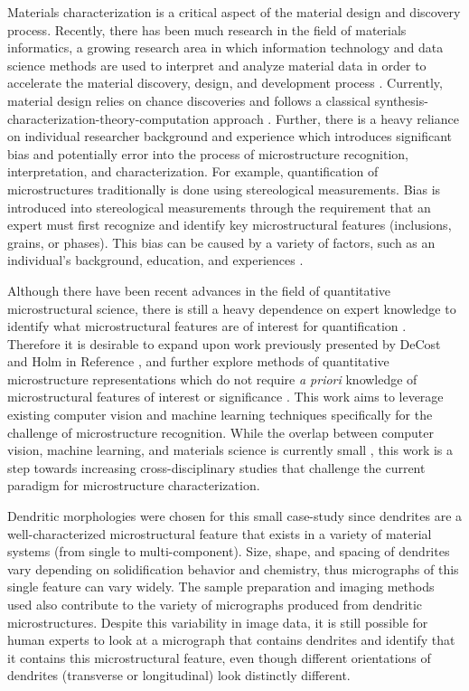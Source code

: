  Materials characterization is a critical aspect of the material design and discovery process.  Recently, there has been much research in the field of materials informatics, a growing research area in which information technology and data science methods are used to interpret and analyze material data in order to accelerate the material discovery, design, and development process \cite{XuH2015, Rodgers2006, Broderick2008, ferris2007materials, Kalidindi2011}.  Currently, material design relies on chance discoveries and follows a classical synthesis-characterization-theory-computation approach \cite{SergeiV.Kalinin2015}.  Further, there is a heavy reliance on individual researcher background and experience which introduces significant bias and potentially error into the process of microstructure recognition, interpretation, and characterization. 
%
For example, quantification of microstructures traditionally is done using stereological measurements.  Bias is introduced into stereological measurements through the requirement that an expert must first recognize and identify key microstructural features (inclusions, grains, or phases).  This bias can be caused by a variety of factors, such as an individual's background, education, and experiences \cite{SergeiV.Kalinin2015}.  

Although there have been recent advances in the field of quantitative microstructural science, there is still a heavy dependence on expert knowledge to identify what microstructural features are of interest for quantification \cite{DeCost2015}. Therefore it is desirable to expand upon work previously presented by DeCost and Holm in Reference \cite{DeCost2015}, and further explore methods of quantitative microstructure representations which do not require \textit{a priori} knowledge of microstructural features of interest or significance \cite{SergeiV.Kalinin2015}. This work aims to leverage existing computer vision and machine learning techniques specifically for the challenge of microstructure recognition.  While the overlap between computer vision, machine learning, and materials science is currently small \cite{SergeiV.Kalinin2015}, this work is a step towards increasing cross-disciplinary studies that challenge the current paradigm for microstructure characterization. 
%

Dendritic morphologies were chosen for this small case-study since dendrites are a well-characterized microstructural feature that exists in a variety of material systems (from single to multi-component).  Size, shape, and spacing of dendrites vary depending on solidification behavior and chemistry, thus micrographs of this single feature can vary widely.  The sample preparation and imaging methods used also contribute to the variety of micrographs produced from dendritic microstructures. Despite this variability in image data, it is still possible for human experts to look at a micrograph that contains dendrites and identify that it contains this microstructural feature, even though different orientations of dendrites (transverse or longitudinal) look distinctly different.  

